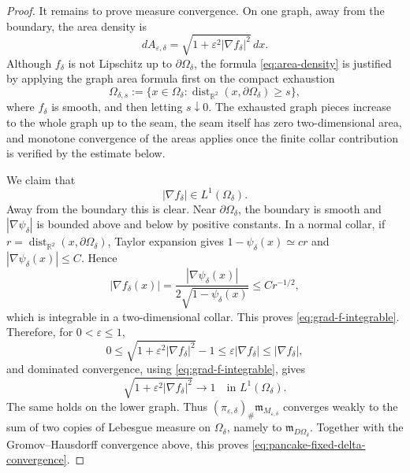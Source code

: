 \documentclass[10pt,a4paper]{amsart}
\DeclareMathOperator{\dist}{dist}
\newcommand{\Om}{\Omega}
\newcommand{\R}{\mathbb R}
\newcommand{\eps}{\varepsilon}
\newcommand{\mm}{\mathfrak m}
\begin{document}
\begin{proof}
It remains to prove measure convergence.  On one graph, away from the boundary,
the area density is
\begin{equation}\label{eq:area-density}
dA_{\eps,\delta}=\sqrt{1+\eps^2|\nabla f_\delta|^2}\,dx.
\end{equation}
Although $f_\delta$ is not Lipschitz up to $\partial\Om_\delta$, the formula
\eqref{eq:area-density} is justified by applying the graph area formula first on
the compact exhaustion
$$
\Om_{\delta,s}:=\{x\in\Om_\delta:\dist_{\R^2}(x,\partial\Om_\delta)\ge s\},
$$
where $f_\delta$ is smooth, and then letting $s\downarrow0$.  The exhausted graph
pieces increase to the whole graph up to the seam, the seam itself has zero
two-dimensional area, and monotone convergence of the areas applies once the
finite collar contribution is verified by the estimate below.

We claim that
\begin{equation}\label{eq:grad-f-integrable}
|\nabla f_\delta|\in L^1(\Om_\delta).
\end{equation}
Away from the boundary this is clear.  Near $\partial\Om_\delta$, the boundary is
smooth and $|\nabla\psi_\delta|$ is bounded above and below by positive
constants.  In a normal collar, if $r=\dist_{\R^2}(x,\partial\Om_\delta)$, Taylor
expansion gives $1-\psi_\delta(x)\simeq c r$ and
$|\nabla\psi_\delta(x)|\le C$.  Hence
$$
|\nabla f_\delta(x)|=
\frac{|\nabla\psi_\delta(x)|}{2\sqrt{1-\psi_\delta(x)}}
\le C r^{-1/2},
$$
which is integrable in a two-dimensional collar.  This proves
\eqref{eq:grad-f-integrable}.  Therefore, for $0<\eps\le1$,
$$
0\le \sqrt{1+\eps^2|\nabla f_\delta|^2}-1\le \eps |\nabla f_\delta|
\le |\nabla f_\delta|,
$$
and dominated convergence, using \eqref{eq:grad-f-integrable}, gives
$$
\sqrt{1+\eps^2|\nabla f_\delta|^2}\to1
\quad\text{in }L^1(\Om_\delta).
$$
The same holds on the lower graph.  Thus
$(\pi_{\eps,\delta})_\#\mm_{M_{\eps,\delta}}$ converges weakly to the sum
of two copies of Lebesgue measure on $\Om_\delta$, namely to
$\mm_{D\Om_\delta}$.  Together with the Gromov--Hausdorff convergence above,
this proves \eqref{eq:pancake-fixed-delta-convergence}.
\end{proof}
\end{document}
